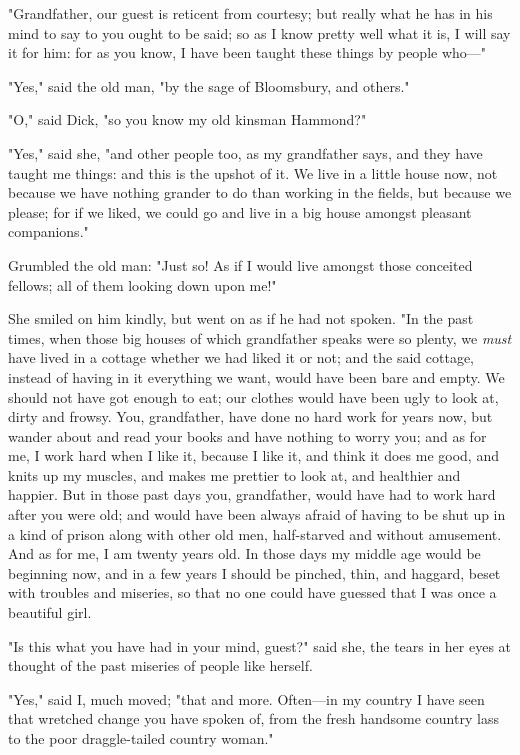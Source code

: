 "Grandfather, our guest is reticent from courtesy; but really what he
has in his mind to say to you ought to be said; so as I know pretty well
what it is, I will say it for him: for as you know, I have been taught
these things by people who---"

"Yes," said the old man, "by the sage of Bloomsbury, and others."

"O," said Dick, "so you know my old kinsman Hammond?"

"Yes," said she, "and other people too, as my grandfather says, and they
have taught me things: and this is the upshot of it. We live in a little
house now, not because we have nothing grander to do than working in the
fields, but because we please; for if we liked, we could go and live in
a big house amongst pleasant companions."

Grumbled the old man: "Just so! As if I would live amongst those
conceited fellows; all of them looking down upon me!"

She smiled on him kindly, but went on as if he had not spoken. "In the
past times, when those big houses of which grandfather speaks were so
plenty, we \emph{must} have lived in a cottage whether we had liked it
or not; and the said cottage, instead of having in it everything we
want, would have been bare and empty. We should not have got enough to
eat; our clothes would have been ugly to look at, dirty and frowsy. You,
grandfather, have done no hard work for years now, but wander about and
read your books and have nothing to worry you; and as for me, I work
hard when I like it, because I like it, and think it does me good, and
knits up my muscles, and makes me prettier to look at, and healthier and
happier. But in those past days you, grandfather, would have had to work
hard after you were old; and would have been always afraid of having to
be shut up in a kind of prison along with other old men, half-starved
and without amusement. And as for me, I am twenty years old. In those
days my middle age would be beginning now, and in a few years I should
be pinched, thin, and haggard, beset with troubles and miseries, so that
no one could have guessed that I was once a beautiful girl.

"Is this what you have had in your mind, guest?" said she, the tears in
her eyes at thought of the past miseries of people like herself.

"Yes," said I, much moved; "that and more. Often---in my country I have
seen that wretched change you have spoken of, from the fresh handsome
country lass to the poor draggle-tailed country woman."

